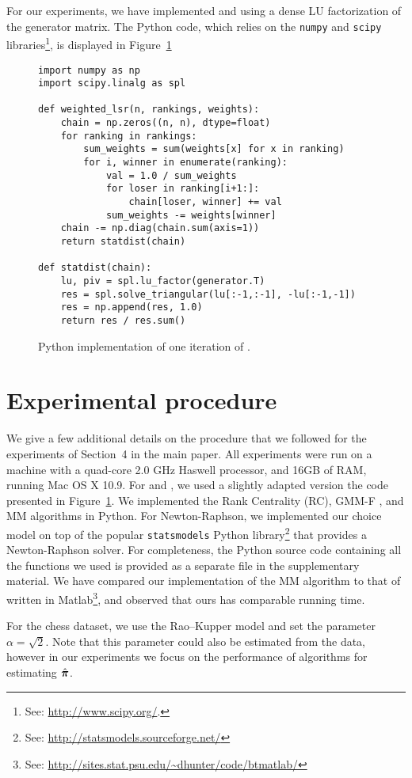 For our experiments, we have implemented \LSR{} and \ILSR{} using a dense LU factorization of the generator matrix.
The Python code, which relies on the \texttt{numpy} and \texttt{scipy} libraries\footnote{
See: \url{http://www.scipy.org/}.
}, is displayed in Figure~\ref{lst:implementation}

\begin{figure}
\label{lst:implementation}
\begin{lstlisting}
import numpy as np
import scipy.linalg as spl

def weighted_lsr(n, rankings, weights):
    chain = np.zeros((n, n), dtype=float)
    for ranking in rankings:
        sum_weights = sum(weights[x] for x in ranking)
        for i, winner in enumerate(ranking):
            val = 1.0 / sum_weights
            for loser in ranking[i+1:]:
                chain[loser, winner] += val
            sum_weights -= weights[winner]
    chain -= np.diag(chain.sum(axis=1))
    return statdist(chain)

def statdist(chain):
    lu, piv = spl.lu_factor(generator.T)
    res = spl.solve_triangular(lu[:-1,:-1], -lu[:-1,-1])
    res = np.append(res, 1.0)
    return res / res.sum()
\end{lstlisting}
\caption{
Python implementation of one iteration of \ILSR{}.
}
\end{figure}

\section{Experimental procedure}

We give a few additional details on the procedure that we followed for the experiments of Section~4 in the main paper.
All experiments were run on a machine with a quad-core 2.0 GHz Haswell processor, and 16GB of RAM, running Mac OS X 10.9.
For \LSR{} and \ILSR{}, we used a slightly adapted version the code presented in Figure~\ref{lst:implementation}.
We implemented the Rank Centrality (RC), GMM-F \citep{azari2013generalized}, and MM \citep{hunter2004mm} algorithms in Python.
For Newton-Raphson, we implemented our choice model on top of the popular \texttt{statsmodels} Python library\footnote{
See: \url{http://statsmodels.sourceforge.net/}
} that provides a Newton-Raphson solver.
For completeness, the Python source code containing all the functions we used is provided as a separate file in the supplementary material.
We have compared our implementation of the MM algorithm to that of \citeauthor{hunter2004mm} written in Matlab\footnote{
See: \url{http://sites.stat.psu.edu/~dhunter/code/btmatlab/}
}, and observed that ours has comparable running time.

For the chess dataset, we use the Rao--Kupper model and set the parameter $\alpha = \sqrt{2}$.
Note that this parameter could also be estimated from the data, however in our experiments we focus on the performance of algorithms for estimating $\hat{\bm{\pi}}$.

